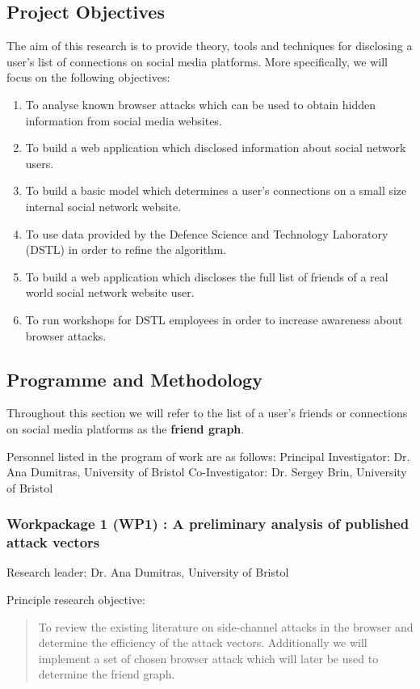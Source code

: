\documentclass[a4paper,11pt]{article}
\begin{document}
\subsection*{Project Objectives}

The aim of this research is to provide theory, tools and techniques for disclosing a user's list of connections on social media platforms. More specifically, we will focus on the following objectives:
\begin{enumerate}
\item To analyse known browser attacks which can be used to obtain hidden information from social media websites.
\item To build a web application which disclosed information about social network users.
\item To build a basic model which determines a user's connections on a small size internal social network website.
\item To use data provided by the Defence Science and Technology Laboratory (DSTL) in order to refine the algorithm.
\item To build a web application which discloses the full list of friends of a real world social network website user.
\item To run workshops for DSTL employees in order to increase awareness about browser attacks.
\end{enumerate}

\subsection*{Programme and Methodology}

Throughout this section we will refer to the list of a user's friends or connections on social media platforms as the \textbf{friend graph}.

Personnel listed in the program of work are as follows:
Principal Investigator: Dr. Ana Dumitras, University of Bristol
Co-Investigator: Dr. Sergey Brin, University of Bristol

\subsubsection*{Workpackage 1 (WP1) : A preliminary analysis of published attack vectors}
Research leader: Dr. Ana Dumitras, University of Bristol

Principle research objective:
\begin{quote}
	To review the existing literature on side-channel attacks in the browser and determine the efficiency of the attack vectors. Additionally we will implement a set of chosen browser attack which will later be used to determine the friend graph.
\end{quote}
\end{document}
